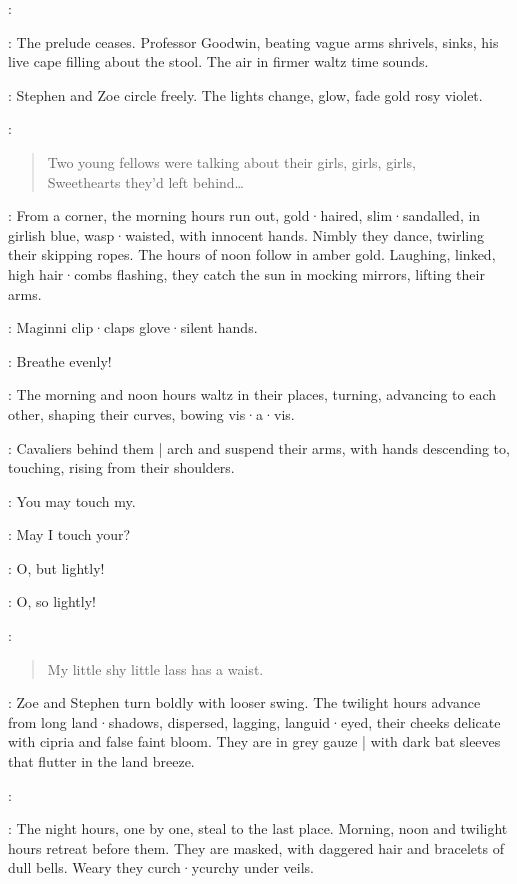 \Maginni:

:
The prelude ceases.
Professor Goodwin,
beating vague arms shrivels,
sinks,
his live cape filling about the stool.
The air in firmer waltz time sounds.

:
Stephen and Zoe circle freely.
The lights change,
%
glow,
fade gold rosy violet.

\Pianola[2]:
\begin{verse}
    Two young fellows were talking about their girls, girls, girls,\\
    Sweethearts they'd left behind…
\end{verse}

:
From a corner,
the morning hours run out,
gold·haired,
slim·sandalled,
in girlish blue,
wasp·waisted,
with innocent hands.
Nimbly they dance,
twirling their skipping ropes.
The hours of noon follow in amber gold.
Laughing,
linked,
high hair·combs flashing,
they catch the sun in mocking mirrors,
lifting their arms.

:
Maginni clip·claps glove·silent hands.

\Maginni:
Breathe evenly!

:
The morning and noon hours waltz in their places,
turning,
advancing to each other,
shaping their curves,
bowing vis·a·vis.

:
Cavaliers behind them |
arch and suspend their arms,
with hands descending to,
touching,
rising from their shoulders.

\Hours:
You may touch my.

\Cavaliers:
May I touch your?

\Hours:
O,
but lightly!

\Cavaliers:
O,
so lightly!

\Pianola:
\begin{verse}
    My little shy little lass has a waist.
\end{verse}

:
Zoe and Stephen turn boldly with looser swing.
The twilight hours advance from long land·shadows,
dispersed,
lagging,
languid·eyed,
their cheeks delicate with cipria and false faint bloom.
They are in grey gauze |
with dark bat sleeves that flutter in the land breeze.

\Maginni[2]:

:
The night hours,
one by one,
steal to the last place.
Morning,
noon and twilight hours retreat before them.
They are masked,
with daggered hair and bracelets of dull bells.
Weary they curch·ycurchy under veils.


